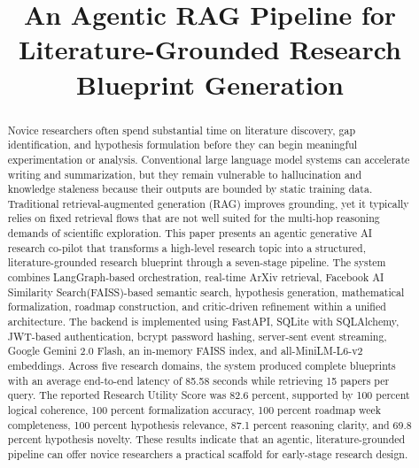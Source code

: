 \documentclass[conference]{IEEEtran}
\begin{document}
\title{An Agentic RAG Pipeline for Literature-Grounded Research Blueprint Generation}

\author{
\and
{}
\and
{}
}

\maketitle

\begin{abstract}
Novice researchers often spend substantial time on literature discovery, gap identification, and hypothesis formulation before they can begin meaningful experimentation or analysis. Conventional large language model systems can accelerate writing and summarization, but they remain vulnerable to hallucination and knowledge staleness because their outputs are bounded by static training data. Traditional retrieval-augmented generation (RAG) improves grounding, yet it typically relies on fixed retrieval flows that are not well suited for the multi-hop reasoning demands of scientific exploration. This paper presents an agentic generative AI research co-pilot that transforms a high-level research topic into a structured, literature-grounded research blueprint through a seven-stage pipeline. The system combines LangGraph-based orchestration, real-time ArXiv retrieval, Facebook AI Similarity Search(FAISS)-based semantic search, hypothesis generation, mathematical formalization, roadmap construction, and critic-driven refinement within a unified architecture. The backend is implemented using FastAPI, SQLite with SQLAlchemy, JWT-based authentication, bcrypt password hashing, server-sent event streaming, Google Gemini 2.0 Flash, an in-memory FAISS index, and all-MiniLM-L6-v2 embeddings. Across five research domains, the system produced complete blueprints with an average end-to-end latency of 85.58 seconds while retrieving 15 papers per query. The reported Research Utility Score was 82.6 percent, supported by 100 percent logical coherence, 100 percent formalization accuracy, 100 percent roadmap week completeness, 100 percent hypothesis relevance, 87.1 percent reasoning clarity, and 69.8 percent hypothesis novelty. These results indicate that an agentic, literature-grounded pipeline can offer novice researchers a practical scaffold for early-stage research design.
\end{abstract}
\end{document}
